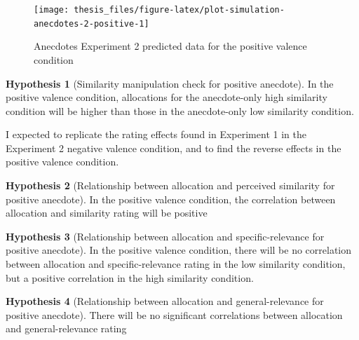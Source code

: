 \documentclass[a4paper, nobind, dvipsnames]{templates/ociamthesis}
\theoremstyle{definition}
\theoremstyle{definition}
\theoremstyle{definition}
\theoremstyle{definition}
\newtheorem{hypothesis}{Hypothesis}[chapter]
\theoremstyle{remark}
\begin{document}
\begin{figure}
\texttt{[image: thesis\_files/figure-latex/plot-simulation-anecdotes-2-positive-1]} \caption{Anecdotes Experiment 2 predicted data for the positive valence condition}\label{fig:plot-simulation-anecdotes-2-positive}
\end{figure}

\begin{hypothesis}[Similarity manipulation check for positive anecdote]
\protect\hypertarget{hyp:similarity-check-anecdotes-2}{}{\label{hyp:similarity-check-anecdotes-2} {} }In the positive valence condition, allocations for the anecdote-only high
similarity condition will be higher than those in the anecdote-only low
similarity condition.
\end{hypothesis}

I expected to replicate the rating effects found in Experiment 1 in the
Experiment 2 negative valence condition, and to find the reverse effects in the
positive valence condition.

\begin{hypothesis}[Relationship between allocation and perceived similarity for positive anecdote]
\protect\hypertarget{hyp:allocation-similarity-anecdotes-2}{}{\label{hyp:allocation-similarity-anecdotes-2} {} }In the positive valence condition, the correlation between allocation and
similarity rating will be positive
\end{hypothesis}

\begin{hypothesis}[Relationship between allocation and specific-relevance for positive anecdote]
\protect\hypertarget{hyp:allocation-specific-relevance-anecdotes-2}{}{\label{hyp:allocation-specific-relevance-anecdotes-2} {} }In the positive valence condition, there will be no correlation between
allocation and specific-relevance rating in the low similarity condition, but a
positive correlation in the high similarity condition.
\end{hypothesis}

\begin{hypothesis}[Relationship between allocation and general-relevance for positive anecdote]
\protect\hypertarget{hyp:allocation-general-relevance-anecdotes-2}{}{\label{hyp:allocation-general-relevance-anecdotes-2} {} }There will be no significant correlations between allocation and
general-relevance rating
\end{hypothesis}
\end{document}
